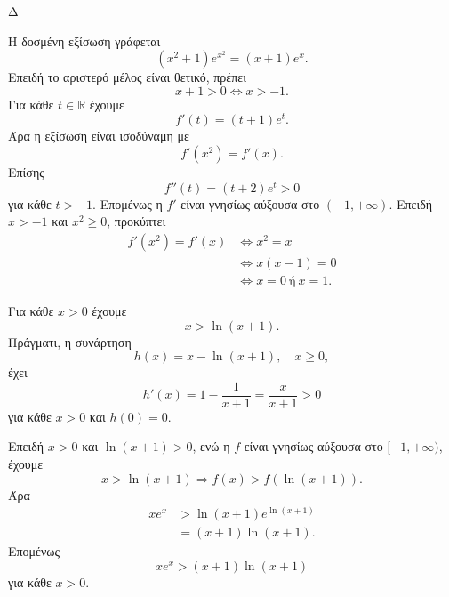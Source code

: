 \begin{thema}{Δ}
\begin{erwthma}
\item Η δοσμένη εξίσωση γράφεται
\[
(x^2+1)e^{x^2}=(x+1)e^x.
\]
Επειδή το αριστερό μέλος είναι θετικό, πρέπει
\[
x+1>0
\Leftrightarrow
x>-1.
\]
Για κάθε $t\in\mathbb{R}$ έχουμε
\[
f'(t)=(t+1)e^t.
\]
Άρα η εξίσωση είναι ισοδύναμη με
\[
f'(x^2)=f'(x).
\]
Επίσης
\[
f''(t)=(t+2)e^t>0
\]
για κάθε $t>-1$. Επομένως η $f'$ είναι γνησίως αύξουσα στο $(-1,+\infty)$. Επειδή $x>-1$ και $x^2\geq0$, προκύπτει
\begin{align*}
f'(x^2)=f'(x)
&\Leftrightarrow x^2=x\\
&\Leftrightarrow x(x-1)=0\\
&\Leftrightarrow {x=0\ \text{ή}\ x=1}.
\end{align*}

Για κάθε $x>0$ έχουμε
\[
x>\ln(x+1).
\]
Πράγματι, η συνάρτηση
\[
h(x)=x-\ln(x+1),\quad x\geq0,
\]
έχει
\[
h'(x)=1-\frac{1}{x+1}=\frac{x}{x+1}>0
\]
για κάθε $x>0$ και $h(0)=0$.

Επειδή $x>0$ και $\ln(x+1)>0$, ενώ η $f$ είναι γνησίως αύξουσα στο $[-1,+\infty)$, έχουμε
\[
x>\ln(x+1)
\Rightarrow
f(x)>f(\ln(x+1)).
\]
Άρα
\begin{align*}
xe^x
&>\ln(x+1)e^{\ln(x+1)}\\
&=(x+1)\ln(x+1).
\end{align*}
Επομένως
\[
{xe^x>(x+1)\ln(x+1)}
\]
για κάθε $x>0$.
\end{erwthma}
\end{thema}

